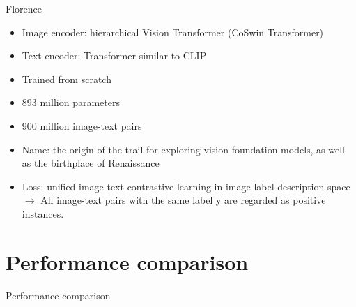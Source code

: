 \documentclass[xcolor=dvipsnames]{beamer}
\begin{document}
\begin{frame}{Florence \parencite{yuan2021florence}}
  \begin{itemize}
    \item Image encoder: hierarchical Vision Transformer (CoSwin Transformer)
    \item Text encoder: Transformer similar to CLIP
    \item Trained from scratch
    \item 893 million parameters \parencite{alford2021alignparams}
    \item 900 million image-text pairs
    \item Name: the origin of the trail for exploring vision foundation models, as well as the birthplace of Renaissance
    \item Loss: unified image-text contrastive learning in image-label-description space $\rightarrow$ All image-text pairs with the same label y are regarded as positive instances.
  \end{itemize}
\end{frame}


\section{Performance comparison} %
\begin{frame}{Performance comparison}
  \begin{table}[ht]
    \centering
    \caption{Top-1 Accuracy of zero-shot transfer of ALIGN to image classification on ImageNet and its variants.}
  \end{table}
\end{frame}
\end{document}
